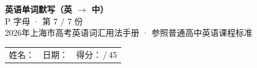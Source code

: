 \documentclass[10pt,a4paper]{article}
\begin{document}
\pagestyle{plain}

\begin{center}
{\LARGE\bfseries 英语单词默写（英 $\to$ 中）}\\[0.22em]
{\large P 字母 · 第 7 / 7 份}\\[0.18em]
{\small 2026年上海市高考英语词汇用法手册 · 参照普通高中英语课程标准}
\end{center}

\vspace{0.25em}
\noindent\begin{tabular}{@{}p{}@{}p{}@{}p{}@{}}
姓名：\underline{\hspace{2.0cm}} & 日期：\underline{\hspace{2.0cm}} & 得分：\underline{\hspace{1.3cm}}\,/\,45 \\
\end{tabular}

\vspace{0.3em}

\vspace{0.08em}
\end{document}
